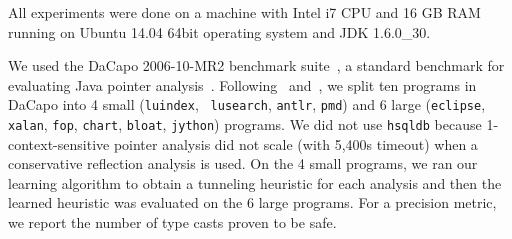 All experiments were done on a machine with Intel i7
CPU and 16 GB RAM running on Ubuntu 14.04 64bit operating system and
JDK 1.6.0\_30.



We used the DaCapo 2006-10-MR2 benchmark suite~\cite{Blackburn2006}, a standard
benchmark for evaluating Java pointer analysis~\cite{
TanLX16,KastrinisS13a, Tan2017,  Smaragdakis2014, JeJeChOh17,  Thiessen2017,   Smaragdakis2011}.
Following~\cite{JeJeChOh17} and~\cite{Smaragdakis2014}, we split ten
programs in DaCapo into 4 small ({\tt luindex}, {\tt
lusearch}, {\tt antlr}, {\tt pmd}) and 6 large ({\tt eclipse}, {\tt
xalan}, {\tt fop}, {\tt chart}, {\tt bloat}, {\tt jython}) programs.
We did not use {\tt hsqldb} because 1-context-sensitive pointer
analysis did not scale (with 5,400s timeout) when a conservative
reflection analysis is used.
On the 4 small programs, we ran our learning algorithm to obtain a
tunneling heuristic for each analysis and then the learned heuristic was
evaluated on the 6 large programs.
For a precision metric, we report the number of type casts proven to be
safe.





